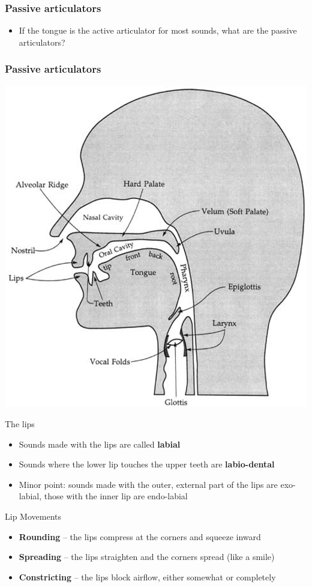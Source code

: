 \documentclass[professionalfonts]{beamer}
\begin{document}
\begin{frame}
    \frametitle{Passive articulators}

    \begin{itemize}
        \item If the tongue is the active articulator for most sounds, what are the passive articulators?
    \end{itemize}
\end{frame}

\begin{frame}
    \frametitle{Passive articulators}

    \begin{center}
        \includegraphics[width = .5\textwidth]{figs/VocalTractLabeled.png}
    \end{center}
\end{frame}

\begin{frame}{The lips}
    \begin{itemize}
        \item Sounds made with the lips are called \textbf{labial}
        \item Sounds where the lower lip touches the upper teeth are \textbf{labio-dental}
        \item Minor point: sounds made with the outer, external part of the lips are exo-labial, those with the inner lip are endo-labial 
    \end{itemize}
\end{frame}

\begin{frame}{Lip Movements}
    \begin{itemize}
        \item \textbf{Rounding} – the lips compress at the corners and squeeze inward
        \item \textbf{Spreading} – the lips straighten and the corners spread (like a smile)
        \item \textbf{Constricting} – the lips block airflow, either somewhat or completely    
    \end{itemize}
    \end{frame}
\end{document}
